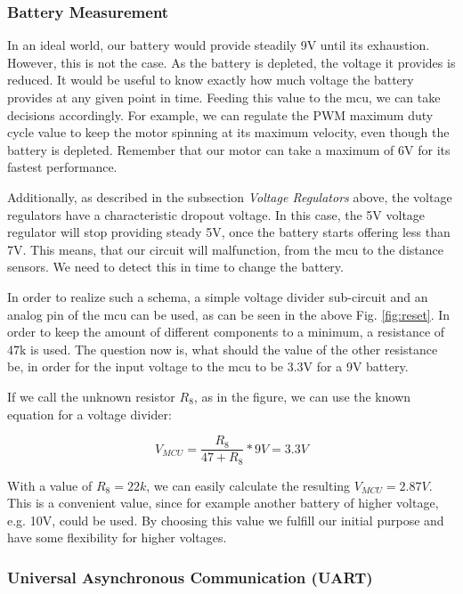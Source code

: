 \vspace{1cm}


\subsubsection{Battery Measurement}

In an ideal world, our battery would provide steadily 9V until its exhaustion. However, this is not the case. As the battery is depleted, the voltage it provides is reduced. It would be useful to know exactly how much voltage the battery provides at any given point in time. Feeding this value to the mcu, we can take decisions accordingly. For example, we can regulate the PWM maximum duty cycle value to keep the motor spinning at its maximum velocity, even though the battery is depleted. Remember that our motor can take a maximum of 6V for its fastest performance.

Additionally, as described in the subsection \textit{Voltage Regulators} above, the voltage regulators have a characteristic dropout voltage. In this case, the 5V voltage regulator will stop providing steady 5V, once the battery starts offering less than 7V. This means, that our circuit will malfunction, from the mcu to the distance sensors. We need to detect this in time to change the battery.

In order to realize such a schema, a simple voltage divider sub-circuit and an analog pin of the mcu can be used, as can be seen in the above Fig. \ref{fig:reset}.
In order to keep the amount of different components to a minimum, a resistance of 47k is used. The question now is, what should the value of the other resistance be, in order for the input voltage to the mcu to be 3.3V for a 9V battery. 

If we call the unknown resistor $R_8$, as in the figure, we can use the known equation for a voltage divider:

$$V_{MCU} = \frac{R_8}{47+R_8} * 9V = 3.3V$$

\noindent
With a value of $ R_8 = 22k $, we can easily calculate the resulting $V_{MCU} = 2.87V$. This is a convenient value, since for example another battery of higher voltage, e.g. 10V, could be used. By choosing this value we fulfill our initial purpose and have some flexibility for higher voltages.

\FloatBarrier
\vspace{1cm}

\subsubsection{Universal Asynchronous Communication (UART)}

